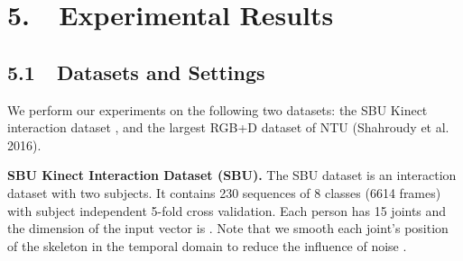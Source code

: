 \documentclass[letterpaper]{article}
\begin{document}
\begin{comment}
We integrate spatial and temporal attention in the same network, which is able to pay different attention to each joint and assign different importance levels to each frame as the action proceeds. Due to the normalized spatial attention through softmax function, it is possible for the network to ignore some joints though they also contain dominant features. Taking the various length of the video sequence into account, to encourage the network pay equal attention to every joint \cite{xu2015show,Ramanathan2015action}, we introduce an additional constraint which can be given by:

This attention penalty can force the model to attend every joint at some point during as the time flows. Finally, we formulate the objective function of the spatial-temporal attention network with a regularised cross-entropy loss as follows:

where  is the one hot label vector,  is the probability that the whole video is labelled as the  class,  is a scalar to balance the contribution of the regularization term, and  is the weight decay coefficient. Besides,  denotes connection matrix in the model.

The LSTM network in Fig.\ref{fig:network} is hard to train because of the huge parameter space. Thus, we train the network iteratively to simplify the training process. Spatial attention weights are first set to 1 to every joint and only temporal attention weights are learned. Then we fix the temporal
attention weights and optimize the parameters in the model of spatial attention. Our LSTM network can be optimized to its best performance after several iterations.
\end{comment}


\section{5.~~Experimental Results}
\subsection{5.1~~Datasets and Settings}
We perform our experiments on the following two datasets: the SBU Kinect interaction dataset \cite{yun2012two}, and the largest RGB+D dataset of NTU (Shahroudy et al. 2016).

\textbf{SBU Kinect Interaction Dataset (SBU).} The SBU dataset is an interaction dataset with two subjects. It contains 230 sequences of 8 classes (6614 frames) with subject independent 5-fold cross validation. Each person has 15 joints and the dimension of the input vector is . Note that we smooth each joint's position of the skeleton in the temporal domain to reduce the influence of noise \cite{CVPR15HRNN,zhu2015co}.
\end{document}
